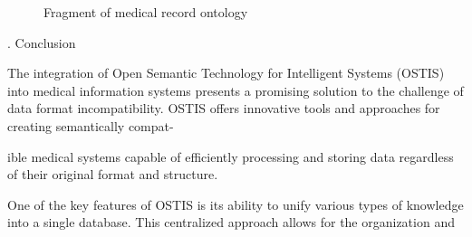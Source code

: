 \documentclass[10pt, a4paper]{article}
\newcommand{\RomanNumeralCaps}[1]
    {\MakeUppercase{\romannumeral #1}}
\begin{document}
\begin{multicols}{2}
\clearpage
\end{multicols}


\begin{figure}[h]
    \caption{Fragment of medical record ontology}
    \label{ris:fourth}
\end{figure}

\fontsize{10}{14}\selectfont
\begin{multicols}{2}
\setlength{\parindent}{0.8cm}
\par
\setlength{\parindent}{0.3cm}
\fontsize{10}{15}\selectfont
\begin{center}
    \RomanNumeralCaps{6}. Conclusion 
\end{center}
\par
The integration of Open Semantic Technology for
Intelligent Systems (OSTIS) into medical information
systems presents a promising solution to the challenge
of data format incompatibility. OSTIS offers innovative
tools and approaches for creating semantically compat-

\columnbreak %

\noindent ible medical systems capable of efficiently processing
and storing data regardless of their original format and
structure.
\par
One of the key features of OSTIS is its ability to
unify various types of knowledge into a single database.
This centralized approach allows for the organization and

\end{multicols}
\end{document}
